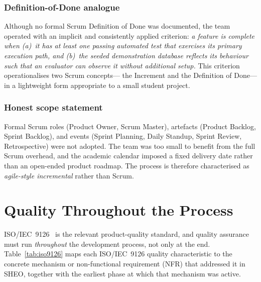 \subsubsection*{Definition-of-Done analogue}
Although no formal Scrum Definition of Done was documented, the team operated with an
implicit and consistently applied criterion: \textit{a feature is complete when (a)~it has
at least one passing automated test that exercises its primary execution path, and
(b)~the seeded demonstration database reflects its behaviour such that an evaluator can
observe it without additional setup.} This criterion operationalises two Scrum concepts---
the Increment and the Definition of Done---in a lightweight form appropriate to a small
student project.

\subsubsection*{Honest scope statement}
Formal Scrum roles (Product Owner, Scrum Master), artefacts (Product Backlog, Sprint
Backlog), and events (Sprint Planning, Daily Standup, Sprint Review, Retrospective) were
not adopted. The team was too small to benefit from the full Scrum overhead, and the
academic calendar imposed a fixed delivery date rather than an open-ended product roadmap.
The process is therefore characterised as \textit{agile-style incremental} rather than
Scrum.

\section{Quality Throughout the Process}
\label{sec:quality}

ISO/IEC~9126~\cite{iso9126} is the relevant product-quality standard, and quality assurance
must run \textit{throughout} the development process, not only at the end.
Table~\ref{tab:iso9126} maps each ISO/IEC~9126 quality characteristic to the
concrete mechanism or non-functional requirement (NFR) that addressed it in SHEO, together
with the earliest phase at which that mechanism was active.


